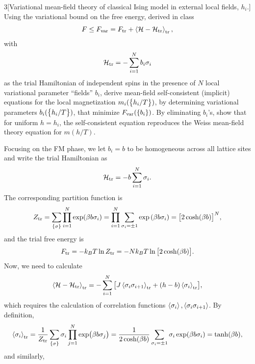 \documentclass[12pt]{article}
\begin{document}
\begin{problem}{3}[Variational mean-field theory of classical Ising model in
    external local fields, $h_i$.]
Using the variational bound on the free energy, derived in class
\begin{equation}
    F\leq F_{\text{var}}=F_{\text{tr}}+\expval{\mathcal{H}-\mathcal{H}_{\text{tr}}}_{\text{tr}}, 
\end{equation}
with
\begin{equation}
    \mathcal{H}_{\text{tr}}=-\sum_{i=1}^Nb_i\sigma_i
\end{equation}
as the trial Hamiltonian of independent spins in the presence of $N$ local
variational parameter ``fields'' $b_i$, derive mean-field self-consistent
(implicit) equations for the local magnetization $m_i(\qty{h_i/T})$, by
determining variational parameters $b_i(\qty{h_i/T})$, that minimize
$F_{\text{var}}(\qty{b_i})$. By eliminating $b_i$'s, show that for uniform $h=h_i$,
the self-consistent equation reproduces the Weiss mean-field theory equation for
$m(h/T)$.
\begin{solution}
Focusing on the FM phase, we let $b_i=b$ to be homogeneous across all lattice
sites and write the trial Hamiltonian as
\begin{equation}
    \mathcal{H}_{\text{tr}}=-b\sum_{i=1}^N\sigma_i.
\end{equation}
The corresponding partition function is
\begin{equation}
    Z_{\text{tr}}=\sum_\qty{\sigma}\prod_{i=1}^N\exp(\beta b\sigma_i)
    =\prod_{i=1}^N\sum_{\sigma_i=\pm1}\exp\qty(\beta b\sigma_i)
    =\qty[2\cosh(\beta b)]^N,
\end{equation}
and the trial free energy is
\begin{equation}
    F_{\text{tr}}=-k_BT\ln Z_{\text{tr}}
    =-Nk_BT\ln\qty[2\cosh(\beta b)].
\end{equation}
Now, we need to calculate
\begin{equation}
    \expval{\mathcal{H}-\mathcal{H}_{\text{tr}}}_{\text{tr}}
    =-\sum_{i=1}^N\qty[
    J\expval{\sigma_i\sigma_{i+1}}_{\text{tr}}
    +(h-b)\expval{\sigma_i}_{\text{tr}}],
\end{equation}
which requires the calculation of correlation functions
$\expval{\sigma_i},\expval{\sigma_i\sigma_{i+1}}$. By definition,
\begin{align}\label{p3:sig}
    \expval{\sigma_i}_{\text{tr}}
    =\frac1{Z_{\text{tr}}}\sum_\qty{\sigma}\sigma_i\prod_{j=1}^N\exp(\beta b\sigma_j)
    =\frac1{2\cosh(\beta b)}\sum_{\sigma_i=\pm 1}\sigma_i\exp(\beta b\sigma_i)
    =\tanh(\beta b),
\end{align}
and similarly,
\begin{align}

\end{align}
\end{solution}
\end{problem}
\end{document}
